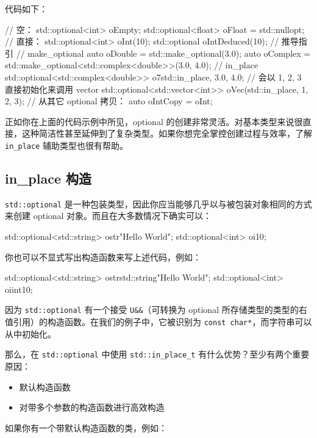 代码如下：

\begin{codebox}[cpp]
// 空：
std::optional<int> oEmpty;
std::optional<float> oFloat = std::nullopt;
// 直接：
std::optional<int> oInt(10);
std::optional oIntDeduced(10); // 推导指引
// make_optional
auto oDouble = std::make_optional(3.0);
auto oComplex = std::make_optional<std::complex<double>>(3.0, 4.0);
// in_place
std::optional<std::complex<double>> o7{std::in_place, 3.0, 4.0};
// 会以 {1, 2, 3} 直接初始化来调用 vector
std::optional<std::vector<int>> oVec(std::in_place, {1, 2, 3});
// 从其它 optional 拷贝：
auto oIntCopy = oInt;
\end{codebox}

正如你在上面的代码示例中所见，optional 的创建非常灵活。对基本类型来说很直接，这种简洁性甚至延伸到了复杂类型。如果你想完全掌控创建过程与效率，了解 \texttt{in\_place} 辅助类型也很有帮助。

\subsection{in\_place 构造}
\texttt{std::optional} 是一种包装类型，因此你应当能够几乎以与被包装对象相同的方式来创建 optional 对象。而且在大多数情况下确实可以：

\begin{codebox}[cpp]
std::optional<std::string> ostr{"Hello World"};
std::optional<int> oi{10};
\end{codebox}

你也可以不显式写出构造函数来写上述代码，例如：

\begin{codebox}[cpp]
std::optional<std::string> ostr{std::string{"Hello World"}};
std::optional<int> oi{int{10}};
\end{codebox}

因为 \texttt{std::optional} 有一个接受 \texttt{U\&\&}（可转换为 optional 所存储类型的类型的右值引用）的构造函数。在我们的例子中，它被识别为 \texttt{const char*}，而字符串可以从中初始化。

那么，在 \texttt{std::optional} 中使用 \texttt{std::in\_place\_t} 有什么优势？至少有两个重要原因：
\begin{itemize}
\item 默认构造函数
\item 对带多个参数的构造函数进行高效构造
\end{itemize}

如果你有一个带默认构造函数的类，例如：

